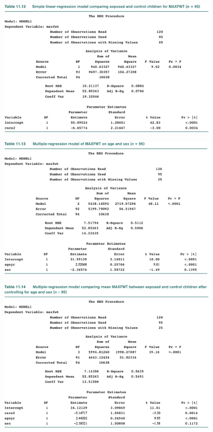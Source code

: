 \documentclass[14pt]{extarticle}
\begin{document}
\begin{figure}[H]
    \centering
    \includegraphics[width=1\textwidth]{fig25.png}
\end{figure}
\begin{figure}[H]
    \centering
    \includegraphics[width=1\textwidth]{fig26.png}
\end{figure}
\begin{figure}[H]
    \centering
    \includegraphics[width=1\textwidth]{fig27.png}
\end{figure}
\end{document}

